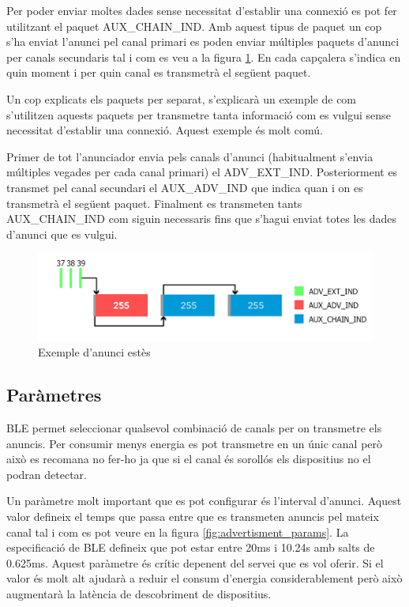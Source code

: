 Per poder enviar moltes dades sense necessitat d'establir una connexió es pot fer utilitzant el paquet AUX\_CHAIN\_IND.
Amb aquest tipus de paquet un cop s'ha enviat l'anunci pel canal primari es poden enviar múltiples paquets d'anunci per canals secundaris tal i com es veu a la figura \ref{fig:aux_chain_ind}.
En cada capçalera s'indica en quin moment i per quin canal es transmetrà el següent paquet.

Un cop explicats els paquets per separat, s'explicarà un exemple de com s'utilitzen aquests paquets per transmetre tanta informació com es vulgui sense necessitat d'establir una connexió.
Aquest exemple és molt comú.

Primer de tot l'anunciador envia pels canals d'anunci (habitualment s'envia múltiples vegades per cada canal primari) el ADV\_EXT\_IND.
Posteriorment es transmet pel canal secundari el AUX\_ADV\_IND que indica quan i on es transmetrà el següent paquet.
Finalment es transmeten tants AUX\_CHAIN\_IND com siguin necessaris fins que s'hagui enviat totes les dades d'anunci que es vulgui.

\begin{figure}[h!]
	\begin{center}
		\includegraphics[width=1\textwidth]{./images/aux_chain_ind.png}
		\caption{Exemple d'anunci estès \cite{aux_chain_ind}}
		\label{fig:aux_chain_ind}
	\end{center}
\end{figure}

\subsection{Paràmetres}
BLE permet seleccionar qualsevol combinació de canals per on transmetre els anuncis.
Per consumir menys energia es pot transmetre en un únic canal però això es recomana no fer-ho ja que si el canal és sorollós els dispositius no el podran detectar.

Un paràmetre molt important que es pot configurar és l'interval d'anunci.
Aquest valor defineix el temps que passa entre que es transmeten anuncis pel mateix canal tal i com es pot veure en la figura \ref{fig:advertisment_params}.
La especificació de BLE defineix que pot estar entre 20ms i 10.24s amb salts de 0.625ms.
Aquest paràmetre és crític depenent del servei que es vol oferir.
Si el valor és molt alt ajudarà a reduir el consum d'energia considerablement però això augmentarà la latència de descobriment de dispositius.

